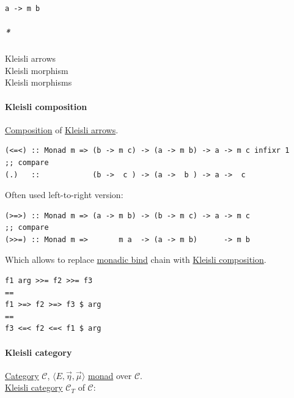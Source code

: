 \documentclass[a4paper,14pt,oneside]{book}
\begin{document}
\begin{verbatim}
a -> m b
\end{verbatim}

\subparagraph{\emph{*}}
\label{sec:org64c0dda}

\label{orga001b9b}Kleisli arrows\\
\label{org8959453}Kleisli morphism\\
\label{org4c30927}Kleisli morphisms\\

\paragraph{\label{orgd8eb9ea}Kleisli composition}
\label{sec:org14b21c7}
\hyperref[orgdb1d873]{Composition} of \hyperref[orga001b9b]{Kleisli arrows}.\\

\begin{verbatim}
(<=<) :: Monad m => (b -> m c) -> (a -> m b) -> a -> m c infixr 1
;; compare
(.)   ::            (b ->  c ) -> (a ->  b ) -> a ->  c
\end{verbatim}

Often used left-to-right version:\\

\begin{verbatim}
(>=>) :: Monad m => (a -> m b) -> (b -> m c) -> a -> m c
;; compare
(>>=) :: Monad m =>       m a  -> (a -> m b)      -> m b
\end{verbatim}

Which allows to replace \hyperref[org68dc635]{monadic bind} chain with \hyperref[orgd8eb9ea]{Kleisli composition}.\\

\begin{verbatim}
f1 arg >>= f2 >>= f3
==
f1 >=> f2 >=> f3 $ arg
==
f3 <=< f2 <=< f1 $ arg
\end{verbatim}

\paragraph{\label{orga2a8682}Kleisli category}
\label{sec:org014bfb2}
\hyperref[org75ddcd0]{Category} \(\mathcal{C}\), \(〈E, \overrightarrow{\eta}, \overrightarrow{\mu}〉\) \hyperref[org27993ff]{monad} over \(\mathcal{C}\).\\

\hyperref[orga2a8682]{Kleisli category} \(\mathcal{C}_{T}\) of \(\mathcal{C}\):\\
\end{document}
